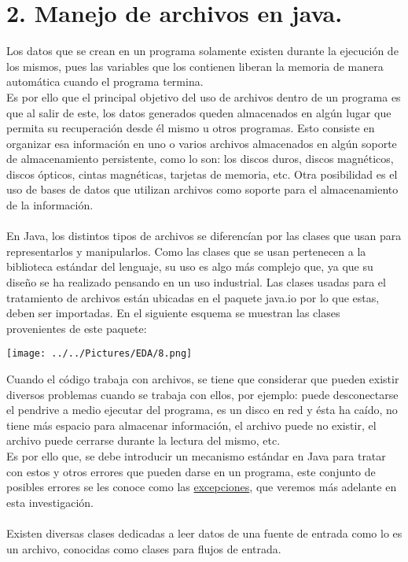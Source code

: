 \documentclass[12pt,letterpaper]{report}
\begin{document}
\section*{\centering \LARGE 2. Manejo de archivos en java.}
Los datos que se crean en un programa solamente existen durante la ejecución de los mismos, pues las variables que los contienen liberan la memoria de manera automática cuando el programa termina.\\
Es por ello que el principal objetivo del uso de archivos dentro de un programa es que al salir de este, los datos generados queden almacenados en algún lugar que permita su recuperación desde él mismo u otros programas. Esto consiste en organizar esa información en uno o varios archivos almacenados en algún soporte de almacenamiento persistente, como lo son: los discos duros, discos magnéticos, discos ópticos, cintas magnéticas, tarjetas de memoria, etc. Otra posibilidad es el uso de bases de datos que utilizan archivos como soporte para el almacenamiento de la información.\\\\ En Java, los distintos tipos de archivos se diferencían por las clases que usan para representarlos y manipularlos. Como las clases que  se usan pertenecen a la biblioteca estándar del lenguaje, su uso es algo más complejo que, ya que su diseño se ha realizado pensando en un uso industrial.
Las clases usadas para el tratamiento de archivos están ubicadas  en el paquete java.io por lo que estas, deben ser importadas.
En el siguiente esquema se muestran las clases provenientes de este paquete:
\begin{center}
\texttt{[image: ../../Pictures/EDA/8.png]} 
\end{center}
Cuando el código trabaja con archivos, se tiene que considerar que  pueden existir diversos problemas cuando se trabaja con ellos, por ejemplo: puede desconectarse el pendrive a medio  ejecutar del programa, es un disco en red y ésta ha caído, no tiene más espacio para almacenar información, el archivo  puede no existir, el archivo puede cerrarse durante la lectura del mismo, etc.\\
Es por ello que, se debe introducir un mecanismo estándar en Java para tratar con estos y otros errores que pueden darse en un programa, este conjunto de posibles errores se les conoce como las \underline{excepciones}, que veremos más adelante en esta investigación.\\\\Existen diversas clases dedicadas a leer datos de una fuente de entrada como lo es un archivo, conocidas como clases para flujos de entrada. 
\end{document}
